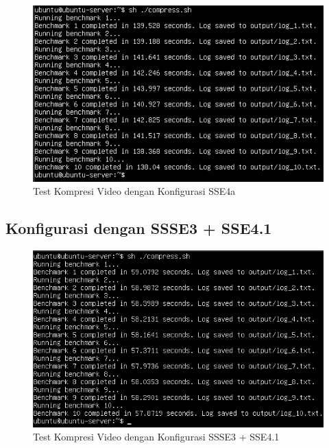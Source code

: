 \begin{figure}
    \centering
    \includegraphics[width=1\textwidth]
    {assets/pics/video-compression-test/sse4a.jpeg}
    \caption{Test Kompresi Video dengan Konfigurasi SSE4a}
    \label{fig:video_compression_test_sse4a}
\end{figure}

\subsection{Konfigurasi dengan SSSE3 + SSE4.1}

\begin{figure}
    \centering
    \includegraphics[width=1\textwidth]
    {assets/pics/video-compression-test/ssse3,sse4.1.jpeg}
    \caption{Test Kompresi Video dengan Konfigurasi SSSE3 + SSE4.1}
    \label{fig:video_compression_test_ssse3,sse4.1}
\end{figure}

